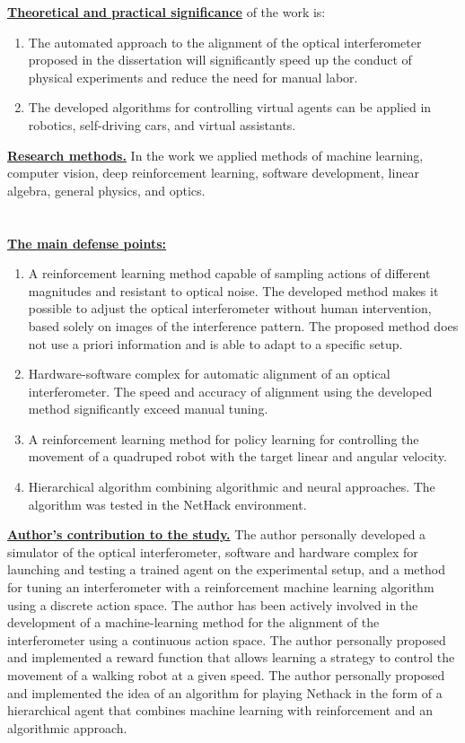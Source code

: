 \underline{\textbf{Theoretical and practical significance}} of the work is:
\begin{enumerate}[beginpenalty=10000] %
  \item The automated approach to the alignment of the optical interferometer proposed in the dissertation will significantly speed up the conduct of physical experiments and reduce the need for manual labor.
  \item The developed algorithms for controlling virtual agents can be applied in robotics, self-driving cars, and virtual assistants.
\end{enumerate}

\underline{\textbf{Research methods.}} In the work we applied methods of machine learning, computer vision, deep reinforcement learning, software development, linear algebra, general physics, and optics.

\section*{}

\underline{\textbf{The main defense points:}}
\begin{enumerate}[beginpenalty=10000] %
  \item A reinforcement learning method capable of sampling actions of different magnitudes and resistant to optical noise. The developed method makes it possible to adjust the optical interferometer without human intervention, based solely on images of the interference pattern. The proposed method does not use a priori information and is able to adapt to a specific setup.
  \item Hardware-software complex for automatic alignment of an optical interferometer. The speed and accuracy of alignment using the developed method significantly exceed manual tuning.
  \item A reinforcement learning method for policy learning for controlling the movement of a quadruped robot with the target linear and angular velocity.
  \item Hierarchical algorithm combining algorithmic and neural approaches. The algorithm was tested in the NetHack environment.
\end{enumerate}

\underline{\textbf{Author’s contribution to the study.}} The author personally developed a simulator of the optical interferometer, software and hardware complex for launching and testing a trained agent on the experimental setup, and a method for tuning an interferometer with a reinforcement machine learning algorithm using a discrete action space. The author has been actively involved in the development of a machine-learning method for the alignment of the interferometer using a continuous action space. The author personally proposed and implemented a reward function that allows learning a strategy to control the movement of a walking robot at a given speed. The author personally proposed and implemented the idea of an algorithm for playing Nethack in the form of a hierarchical agent that combines machine learning with reinforcement and an algorithmic approach. 

